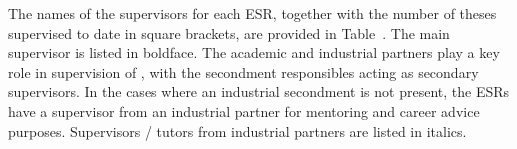 The names of the supervisors for each ESR, together with the number of
theses supervised to date in square brackets,
are provided in Table~\cite{tab:recruitmentDeliverables}.
The main supervisor is listed in boldface. 
The academic and industrial partners play a key role in 
supervision of \acronym, 
with the secondment responsibles acting as secondary supervisors. 
In the cases where an industrial secondment is not present, the ESRs have a supervisor from an industrial partner
for mentoring and career advice purposes. 
Supervisors / tutors from industrial partners
are listed in italics. 



